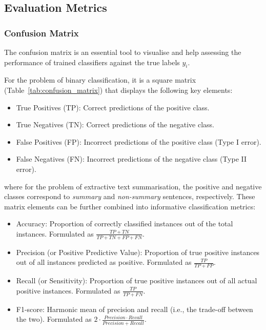 \subsection{Evaluation Metrics}\label{subsec:evaluation-metrics}
\subsubsection{Confusion Matrix}\label{subsubsec:confusion-matrix}
The confusion matrix is an essential tool to visualise and help assessing the performance of trained classifiers against
the true labels $y_{i}$.

For the problem of binary classification, it is a square matrix (Table~\ref{tab:confusion_matrix}) that displays the
following key elements:

\begin{itemize}
    \item True Positives (TP): Correct predictions of the positive class.
    \item True Negatives (TN): Correct predictions of the negative class.
    \item False Positives (FP): Incorrect predictions of the positive class (Type I error).
    \item False Negatives (FN): Incorrect predictions of the negative class (Type II error).
\end{itemize}

where for the problem of extractive text summarisation, the positive and negative classes correspond to \emph{summary}
and \emph{non-summary} sentences, respectively.
These matrix elements can be further combined into informative classification metrics:

\begin{itemize}
    \item Accuracy: Proportion of correctly classified instances out of the total instances.
    Formulated as $\frac{TP + TN}{TP + TN + FP + FN}$.
    \item Precision (or Positive Predictive Value): Proportion of true positive instances out of all instances predicted as positive.
    Formulated as $\frac{TP}{TP + FP}$.
    \item Recall (or Sensitivity): Proportion of true positive instances out of all actual positive instances.
    Formulated as $\frac{TP}{TP + FN}$.
    \item F1-score: Harmonic mean of precision and recall (i.e., the trade-off between the two).
    Formulated as $2 \cdot \frac{Precision \cdot Recall}{Precision + Recall}$.
\end{itemize}



